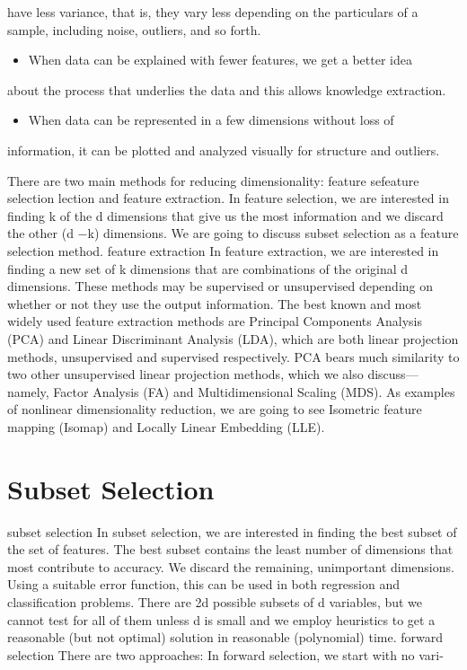 have less variance, that is, they vary less depending on the particulars of a sample, including noise, outliers, and so forth.

\begin{itemize}
\item When data can be explained with fewer features, we get a better idea
\end{itemize}

about the process that underlies the data and this allows knowledge extraction.

\begin{itemize}
\item When data can be represented in a few dimensions without loss of
\end{itemize}

information, it can be plotted and analyzed visually for structure and outliers.

There are two main methods for reducing dimensionality: feature sefeature selection lection and feature extraction. In feature selection, we are interested in finding k of the d dimensions that give us the most information and we discard the other (d $-$k) dimensions. We are going to discuss subset selection as a feature selection method. feature extraction In feature extraction, we are interested in finding a new set of k dimensions that are combinations of the original d dimensions. These methods may be supervised or unsupervised depending on whether or not they use the output information. The best known and most widely used feature extraction methods are Principal Components Analysis (PCA) and Linear Discriminant Analysis (LDA), which are both linear projection methods, unsupervised and supervised respectively. PCA bears much similarity to two other unsupervised linear projection methods, which we also discuss---namely, Factor Analysis (FA) and Multidimensional Scaling (MDS). As examples of nonlinear dimensionality reduction, we are going to see Isometric feature mapping (Isomap) and Locally Linear Embedding (LLE).

\section{Subset Selection}

subset selection In subset selection, we are interested in finding the best subset of the set of features. The best subset contains the least number of dimensions that most contribute to accuracy. We discard the remaining, unimportant dimensions. Using a suitable error function, this can be used in both regression and classification problems. There are 2d possible subsets of d variables, but we cannot test for all of them unless d is small and we employ heuristics to get a reasonable (but not optimal) solution in reasonable (polynomial) time. forward selection There are two approaches: In forward selection, we start with no vari-


